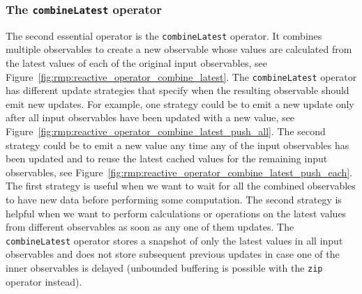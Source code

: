 \subsubsection{The \texttt{combineLatest} operator}

The second essential operator is the \texttt{combineLatest} operator.
It combines multiple observables to create a new observable whose values are calculated from
the latest values of each of the original input observables, see
Figure~\ref{fig:rmp:reactive_operator_combine_latest}.
The \texttt{combineLatest} operator has different update strategies that specify when the
resulting observable should emit new updates.
For example, one strategy could be to emit a new update only after all input observables have
been updated with a new value, see Figure~\ref{fig:rmp:reactive_operator_combine_latest_push_all}.
The second strategy could be to emit a new value any time any of the input observables has
been updated and to reuse the latest cached values for the remaining input observables, see
Figure~\ref{fig:rmp:reactive_operator_combine_latest_push_each}.
The first strategy is useful when we want to wait for all the combined observables to have new
data before performing some computation.
The second strategy is helpful when we want to perform calculations or operations on the
latest values from different observables as soon as any one of them updates.
The \texttt{combineLatest} operator stores a snapshot of only the latest values in all input
observables and does not store subsequent previous updates in case one of the inner
observables is delayed (unbounded buffering is possible with the \texttt{zip} operator
instead).



